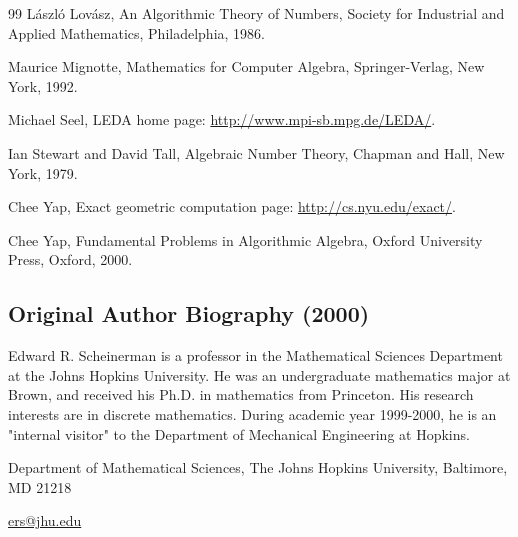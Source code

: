 \documentclass[11pt,letterpaper]{article}
\begin{document}
\begin{thebibliography}{99}
 László Lovász, An Algorithmic Theory of Numbers, Society for Industrial and Applied Mathematics, Philadelphia, 1986.

 Maurice Mignotte, Mathematics for Computer Algebra, Springer-Verlag, New York, 1992.

 Michael Seel, LEDA home page: \url{http://www.mpi-sb.mpg.de/LEDA/}.

 Ian Stewart and David Tall, Algebraic Number Theory, Chapman and Hall, New York, 1979.

 Chee Yap, Exact geometric computation page: \href{http://cs.nyu.edu/exact/}{http://cs.nyu.edu/exact/}.

 Chee Yap, Fundamental Problems in Algorithmic Algebra, Oxford University Press, Oxford, 2000.
\end{thebibliography}


\subsection*{Original Author Biography (2000)}
Edward R. Scheinerman is a professor in the Mathematical Sciences Department at the Johns Hopkins University. He was an undergraduate mathematics major at Brown, and received his Ph.D. in mathematics from Princeton. His research interests are in discrete mathematics. During academic year 1999-2000, he is an "internal visitor" to the Department of Mechanical Engineering at Hopkins.

Department of Mathematical Sciences, The Johns Hopkins University, Baltimore, MD 21218

\href{mailto:ers@jhu.edu}{ers@jhu.edu}
\end{document}
